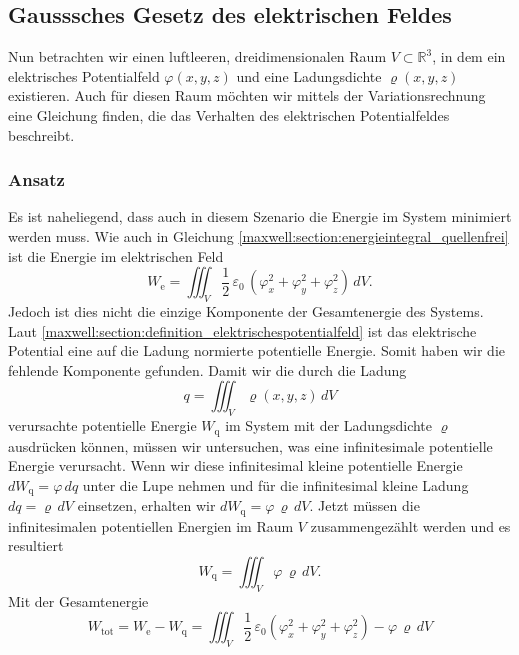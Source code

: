 %
%
%
%
\subsection{Gausssches Gesetz des elektrischen Feldes
\label{maxwell:section:elektrostatik_mit_quelle}}
Nun betrachten wir einen luftleeren, dreidimensionalen Raum $V\subset\mathbb{R}^3$, in dem ein elektrisches Potentialfeld $\varphi(x,y,z)$ und eine Ladungsdichte $\varrho(x,y,z)$ existieren.
Auch für diesen Raum möchten wir mittels der Variationsrechnung eine Gleichung finden, die das Verhalten des elektrischen Potentialfeldes beschreibt.

\subsubsection{Ansatz}
Es ist naheliegend, dass auch in diesem Szenario die Energie im System minimiert werden muss.
Wie auch in Gleichung \eqref{maxwell:section:energieintegral_quellenfrei} ist die Energie im elektrischen Feld
\[
W_{\text{e}}
=
\iiint_V \frac{1}{2}\,\varepsilon_0\,(\varphi_x^2 + \varphi_y^2 + \varphi_z^2)\, dV.
\]
Jedoch ist dies nicht die einzige Komponente der Gesamtenergie des Systems.
Laut \eqref{maxwell:section:definition_elektrischespotentialfeld} ist das elektrische Potential eine auf die Ladung normierte potentielle Energie.
Somit haben wir die fehlende Komponente gefunden.
Damit wir die durch die Ladung
\begin{equation}
q
=
\iiint_V \varrho(x,y,z)\, dV
\label{maxwell:ladung}
\end{equation}
verursachte potentielle Energie $W_{\text{q}}$ im System mit der Ladungsdichte $\varrho$ ausdrücken können, müssen wir untersuchen, was eine infinitesimale potentielle Energie verursacht.
Wenn wir diese infinitesimal kleine potentielle Energie
\(
dW_{\text{q}}
=
\varphi\, dq
\)
unter die Lupe nehmen und für die infinitesimal kleine Ladung
\(
dq
=
\varrho\, dV
\)
einsetzen, erhalten wir
\(
dW_{\text{q}}
=
\varphi\,\varrho\, dV.
\)
Jetzt müssen die infinitesimalen potentiellen Energien im Raum $V$ zusammengezählt werden und es resultiert
\begin{equation}
W_{\text{q}}
=
\iiint_V \varphi\,\varrho\, dV.
\label{maxwell:section:potenzielle_energie_ladung}
\end{equation}
Mit der Gesamtenergie
\[
W_{\text{tot}}
=
W_{\text{e}} - W_{\text{q}}
=
\iiint_V \frac{1}{2}\,\varepsilon_0\left(\varphi_x^2 + \varphi_y^2 + \varphi_z^2\right) - \varphi\,\varrho\, dV
\]
